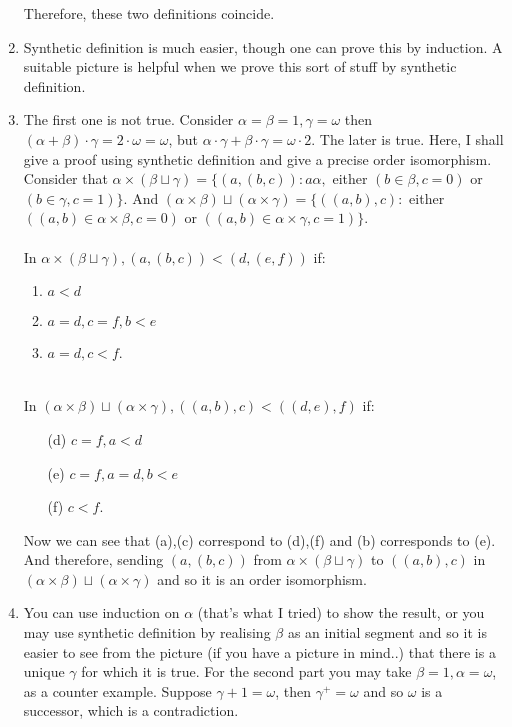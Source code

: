 \begin{enumerate}
\begin{enumerate}
    \end{enumerate}
    Therefore, these two definitions coincide.\\
\item Synthetic definition is much easier, though one can prove this by induction. A suitable picture is helpful when we prove this sort of stuff by synthetic definition.\\
\item The first one is not true. Consider $\alpha=\beta=1, \gamma = \omega$ then $(\alpha+\beta) \cdot \gamma = 2 \cdot \omega = \omega$, but $\alpha \cdot \gamma + \beta \cdot \gamma = \omega \cdot 2$.  The later is true. Here, I shall give a proof using synthetic definition and give a precise order isomorphism. Consider that $\alpha \times (\beta \sqcup \gamma) = \{(a,(b,c)): a \alpha,$ either $(b \in \beta, c=0)$ or $(b \in \gamma, c=1)\}$. And $(\alpha \times \beta) \sqcup (\alpha \times \gamma) =\{((a,b),c):$ either $((a,b) \in \alpha \times \beta,c=0)$ or $((a,b) \in \alpha \times \gamma, c=1)\}$. \\
    ~\\
    In $\alpha \times (\beta \sqcup \gamma), (a,(b,c))<(d,(e,f))$ if:
    \begin{enumerate}
    \item $a<d$\\
    \item $a=d,c=f, b<e$\\
    \item $a=d,c<f$.
    \end{enumerate}
    ~\\
    In $(\alpha \times \beta) \sqcup (\alpha \times \gamma), ((a,b),c)<((d,e),f)$ if:
    \begin{enumerate}
    \item[(d)] $c=f, a<d$\\
    \item[(e)] $c=f, a=d,b<e$\\
    \item[(f)] $c<f$.
    \end{enumerate}
    Now we can see that (a),(c) correspond to (d),(f) and (b) corresponds to (e). And therefore, sending $(a,(b,c))$ from $\alpha \times (\beta \sqcup \gamma)$ to $((a,b),c)$ in $(\alpha \times \beta) \sqcup (\alpha \times \gamma)$ and so it is an order isomorphism.\\
\item You can use induction on $\alpha$ (that's what I tried) to show the result, or you may use synthetic definition by realising $\beta$ as an initial segment and so it is easier to see from the picture (if you have a picture in mind..) that there is a unique $\gamma$ for which it is true. For the second part you may take $\beta=1, \alpha=\omega$, as a counter example. Suppose $\gamma +1 =\omega$, then $\gamma^+ =\omega$ and so $\omega$ is a successor, which is a contradiction.\\

\end{enumerate}
